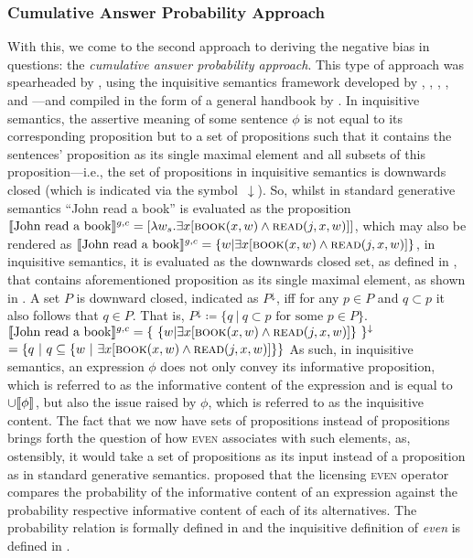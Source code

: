 \subsubsection{Cumulative Answer Probability Approach}
With this, we come to the second approach to deriving the negative bias in questions: the \textit{cumulative answer probability approach}. This type of approach was spearheaded by \textcite{Jeong2021,Jeong2022}, using the inquisitive semantics framework developed by \textcite{Ciardelli2009}, \textcite{Groenendijk2009}, \textcite{Mascarenhas2009}, \textcite{CiardelliRoelofsen2009}, and \textcite{GroenendijkRoelofsen2009}---and compiled in the form of a general handbook by \textcite{Ciardelli2019}. In inquisitive semantics, the assertive meaning of some sentence $\phi$ is not equal to its corresponding proposition but to a set of propositions such that it contains the sentences' proposition as its single maximal element and all subsets of this proposition---i.e., the set of propositions in inquisitive semantics is downwards closed (which is indicated via the symbol~$\downarrow$). So, whilst in standard generative semantics \enquote{John read a book} is evaluated as the proposition $\intension[g,c]{John read a book}=[\lambda{w_s}.\exists{x}[\predicate{book}(x,w)\land\predicate{read}(j,x,w)]]$, which may also be rendered as $\intension[g,c]{John read a book}=\{w|\exists{x}[\predicate{book}(x,w)\land\predicate{read}(j,x,w)]\}$, in inquisitive semantics, it is evaluated as the downwards closed set, as defined in , that contains aforementioned proposition as its single maximal element, as shown in .
\ex\label{def:downward-closed}
A set $P$ is downward closed, indicated as $P^\downarrow$, iff for any $p\in P$ and $q\subset p$ it also follows that $q\in P$. That is, $P^\downarrow\coloneqq\{q~|~q\subset p\text{ for some }p\in P\}$.
\xe
\ex
$\intension[g,c]{John read a book}=\{~\{w|\exists{x}[\predicate{book}(x,w)\land\predicate{read}(j,x,w)]\}~\}^\downarrow$\\
\hbox{}\hspace{114pt}$=\{q~|~q\subseteq \{w~|~\exists{x}[\predicate{book}(x,w)\land\predicate{read}(j,x,w)]\}\}$
\xe
As such, in inquisitive semantics, an expression $\phi$ does not only convey its informative proposition, which is referred to as the informative content of the expression and is equal to $\cup\intension[]{$\phi$}$, but also the issue raised by $\phi$, which is referred to as the inquisitive content. The fact that we now have sets of propositions instead of propositions brings forth the question of how {\scshape even} associates with such elements, as, ostensibly, it would take a set of propositions as its input instead of a proposition as in standard generative semantics. \textcite{Roelofsen2018} proposed that the licensing {\scshape even} operator compares the probability of the informative content of an expression against the probability respective informative content of each of its alternatives. The probability relation is formally defined in  and the inquisitive definition of \textit{even} is defined in .
